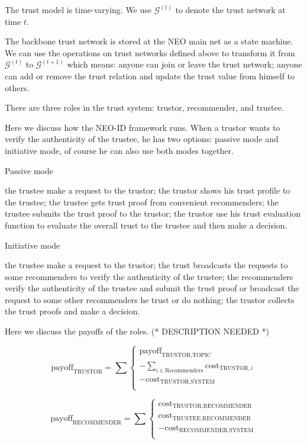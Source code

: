 \documentclass{article}
\begin{document}
The trust model is time-varying. We use \(\mathcal{G}^{(t)}\) to denote the trust network at time \(t\).

The backbone trust network is stored at the NEO main net as a state machine. We can use the operations on trust networks defined above to transform
it from \(\mathcal{G}^{(t)}\) to \(\mathcal{G}^{(t+1)}\) which means: anyone can join or leave the trust network; anyone can add or remove the trust
relation and update the trust value from himself to others.

There are three roles in the trust system: trustor, recommender, and trustee.

Here we discuss how the NEO-ID framework runs. When a trustor wants to verify the authenticity of the trustee, he has two options: passive mode and
initiative mode, of course he can also use both modes together.

Passive mode

the trustee make a request to the trustor; the trustor shows his trust profile to the trustee; the trustee gets trust proof from convenient recommenders;
the trustee submits the trust proof to the trustor; the trustor use his trust evaluation function to evaluate the overall trust to the trustee and
then make a decision.

Initiative mode

the trustee make a request to the trustor; the trust broadcasts the requests to some recommenders to verify the authenticity of the trustee; the
recommenders verify the authenticity of the trustee and submit the trust proof or broadcast the request to some other recommenders he trust or do
nothing; the trustor collects the trust proofs and make a decision.

Here we discuss the payoffs of the roles. (* DESCRIPTION NEEDED *)

\begin{equation}
\text{payoff}_{\text{TRUSTOR}}=\sum \left\{
\begin{array}{c}
 \text{payoff}_{\text{TRUSTOR},\text{TOPIC}} \\
 -\sum _{i\in \text{Recommenders}} \text{cost}_{\text{TRUSTOR},i} \\
 -\text{cost}_{\text{TRUSTOR},\text{SYSTEM}} \\
\end{array}
\right.
\end{equation}

\begin{equation}
\text{payoff}_{\text{RECOMMENDER}}=\sum \left\{
\begin{array}{c}
 \text{cost}_{\text{TRUSTOR},\text{RECOMMENDER}} \\
 \text{cost}_{\text{TRUSTEE},\text{RECOMMENDER}} \\
 -\text{cost}_{\text{RECOMMENDER},\text{SYSTEM}} \\
\end{array}
\right.
\end{equation}
\end{document}
